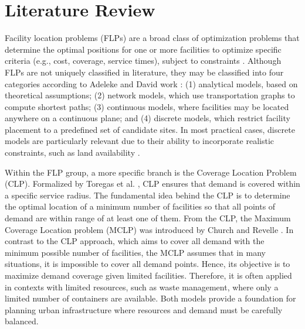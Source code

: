 \section{Literature Review}
\label{literature_review}

Facility location problems (FLPs) are a broad class of optimization problems that determine the optimal positions for one or more facilities to optimize specific criteria (e.g., cost, coverage, service times), subject to constraints \cite{farahani2009facility}. Although FLPs are not uniquely classified in literature, they may be classified into four categories according to Adeleke and David work \cite{adeleke2020facility}: (1) analytical models, based on theoretical assumptions; (2) network models, which use transportation graphs to compute shortest paths; (3) continuous models, where facilities may be located anywhere on a continuous plane; and (4) discrete models, which restrict facility placement to a predefined set of candidate sites. In most practical cases, discrete models are particularly relevant due to their ability to incorporate realistic constraints, such as land availability \cite{adeleke2020facility}. 

Within the FLP group, a more specific branch is the Coverage Location Problem (CLP). Formalized by Toregas et al. \cite{toregas1971,berman2010, broin1986}, CLP ensures that demand is covered within a specific service radius. The fundamental idea behind the CLP is to determine the optimal location of a minimum number of facilities so that all points of demand are within range of at least one of them. From the CLP, the Maximum Coverage Location problem (MCLP) was introduced by Church and Revelle \cite{church1974}. In contrast to the CLP approach, which aims to cover all demand with the minimum possible number of facilities, the MCLP assumes that in many situations, it is impossible to cover all demand points. Hence, its objective is to maximize demand coverage given limited facilities. Therefore, it is often applied in contexts with limited resources, such as waste management, where only a limited number of containers are available. Both models provide a foundation for planning urban infrastructure where resources and demand must be carefully balanced.

